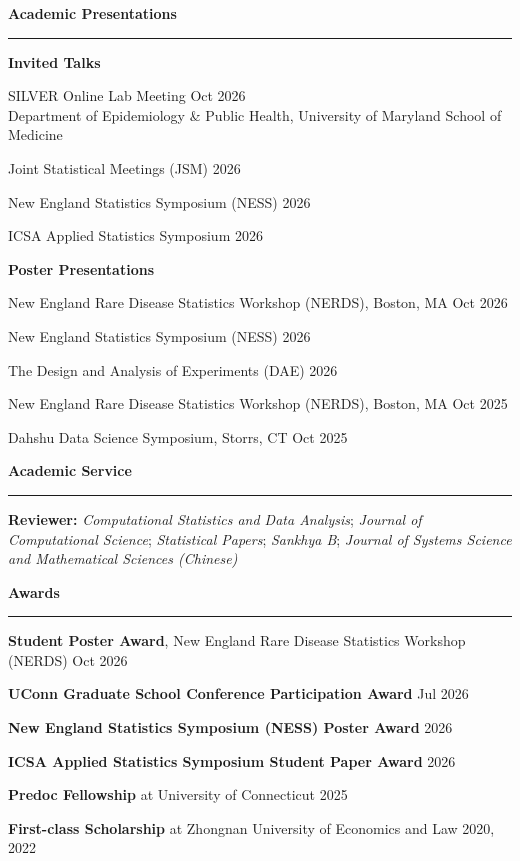 \documentclass[a4paper,10pt]{article}
\newcommand{\resheading}[1]{
  \vspace{4pt}
  \noindent\textbf{\large #1}\par
  \vspace{2pt}
  \hrule
  \vspace{4pt}
}
\newenvironment{reslist}[1][0pt]{%
  \begin{list}{}{%
    \setlength{\leftmargin}{0pt}%
    \setlength{\rightmargin}{0pt}%
    \setlength{\labelwidth}{0pt}%
    \setlength{\labelsep}{0pt}%
    \setlength{\itemindent}{0pt}%
    \setlength{\listparindent}{0pt}%
    \setlength{\itemsep}{#1}%
    \setlength{\topsep}{0pt}%
    \setlength{\parsep}{0pt}%
    \setlength{\partopsep}{0pt}%
  }%
}{\end{list}}
\newenvironment{bulletlist}[1][0pt]{%
  \begin{list}{\textbullet}{%
    \setlength{\leftmargin}{14pt}%
    \setlength{\rightmargin}{0pt}%
    \setlength{\labelwidth}{8pt}%
    \setlength{\labelsep}{6pt}%
    \setlength{\itemindent}{0pt}%
    \setlength{\listparindent}{0pt}%
    \setlength{\itemsep}{#1}%
    \setlength{\topsep}{2pt}%
    \setlength{\parsep}{0pt}%
    \setlength{\partopsep}{0pt}%
  }%
}{\end{list}}
\begin{document}
\resheading{Academic Presentations}
\begin{reslist}[2pt]
  \item \textbf{Invited Talks}
  \begin{bulletlist}[0pt]
    \item SILVER Online Lab Meeting \hfill Oct 2026 \\
    Department of Epidemiology \& Public Health, University of Maryland School of Medicine
    \item Joint Statistical Meetings (JSM) \hfill 2026
    \item New England Statistics Symposium (NESS) \hfill 2026
    \item ICSA Applied Statistics Symposium \hfill 2026
  \end{bulletlist}
  \item \textbf{Poster Presentations}
  \begin{bulletlist}[0pt]
    \item New England Rare Disease Statistics Workshop (NERDS), Boston, MA \hfill Oct 2026
    \item New England Statistics Symposium (NESS) \hfill 2026
    \item The Design and Analysis of Experiments (DAE) \hfill 2026
    \item New England Rare Disease Statistics Workshop (NERDS), Boston, MA \hfill Oct 2025
    \item Dahshu Data Science Symposium, Storrs, CT \hfill Oct 2025
  \end{bulletlist}
\end{reslist}

\newpage
\resheading{Academic Service}
\begin{reslist}[2pt]
   \item \textbf{Reviewer:} \textit{Computational Statistics and Data Analysis}; \textit{Journal of Computational Science}; \textit{Statistical Papers}; \textit{Sankhya B}; \textit{Journal of Systems Science and Mathematical Sciences (Chinese)}
\end{reslist}

\resheading{Awards}
\begin{reslist}[2pt]
   \item \textbf{Student Poster Award}, New England Rare Disease Statistics Workshop (NERDS) \hfill Oct 2026
   \item \textbf{UConn Graduate School Conference Participation Award} \hfill Jul 2026
   \item \textbf{New England Statistics Symposium (NESS) Poster Award} \hfill 2026
   \item \textbf{ICSA Applied Statistics Symposium Student Paper Award} \hfill 2026
   \item \textbf{Predoc Fellowship} at University of Connecticut \hfill 2025
   \item \textbf{First-class Scholarship} at Zhongnan University of Economics and Law \hfill 2020, 2022
\end{reslist}
\end{document}
